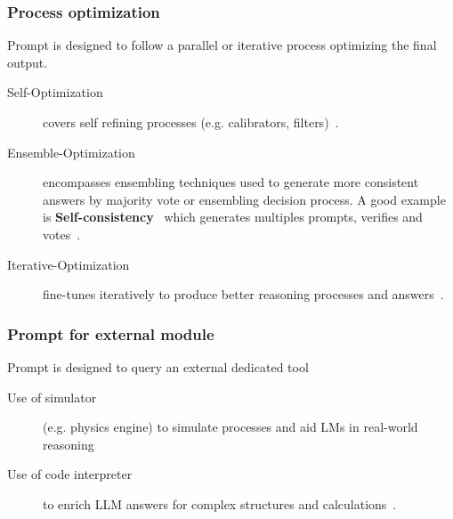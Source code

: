 \documentclass[acmsmall]{acmart}
\begin{document}
\subsubsection{Process optimization}
Prompt is designed to follow a parallel or iterative process optimizing the final output.
    \begin{description}
        \item [Self-Optimization] covers self refining processes (e.g. calibrators, filters)~\citep{yeUnreliabilityExplanationsFewshot2022, wiegreffeReframingHumanAICollaboration2021}.

        \item [Ensemble-Optimization] encompasses ensembling techniques used to generate more consistent answers by majority vote or ensembling decision process. A good example  is \textbf{Self-consistency}~\citep{wangSelfConsistencyImprovesChain2022} which generates multiples prompts, verifies and votes~\citep{wengLargeLanguageModels2022}.

        \item [Iterative-Optimization] fine-tunes iteratively to produce better reasoning processes and answers~\citep{wangIterativelyPromptPretrained2022, huangLargeLanguageModels2022, zelikmanSTaRBootstrappingReasoning2022}.
    \end{description}

\subsubsection{Prompt for external module}
Prompt is designed to query an external dedicated tool
    \begin{description}
        \item [Use of simulator] (e.g. physics engine) to simulate processes and aid LMs in real-world reasoning~\citep{liuMindEyeGrounded2022, jacksonNaturalLanguageSimulations2022}
        \item [Use of code interpreter] to enrich LLM answers for complex structures and calculations~\citep{lyuFaithfulChainofThoughtReasoning2023, chenProgramThoughtsPrompting2022, madaanLanguageModelsCode2022, gaoPALProgramaidedLanguage2023}.
    \end{description}
\end{document}
